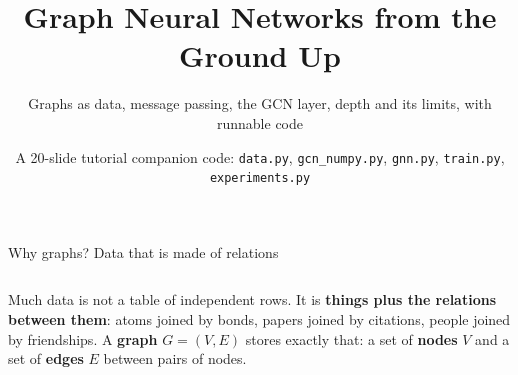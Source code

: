 \documentclass[aspectratio=169,10pt]{beamer}
\title{Graph Neural Networks from the Ground Up}
\subtitle{Graphs as data, message passing, the GCN layer, depth and its limits, with runnable code}
\date{A 20-slide tutorial \textbullet{} companion code: \texttt{data.py}, \texttt{gcn\_numpy.py},
      \texttt{gnn.py}, \texttt{train.py}, \texttt{experiments.py}}
\newcommand{\key}[1]{\textbf{\color{cAtt}#1}}
\begin{document}
\maketitle
\addtocounter{framenumber}{1}

\begin{frame}{Why graphs? Data that is made of relations}
\begin{columns}[T,onlytextwidth]
\small
Much data is not a table of independent rows. It is \textbf{things plus the relations between them}:
atoms joined by bonds, papers joined by citations, people joined by friendships.
A \key{graph} $G=(V,E)$ stores exactly that: a set of \textbf{nodes} $V$ and a set of
\textbf{edges} $E$ between pairs of nodes.


\end{columns}
\end{frame}
\end{document}
